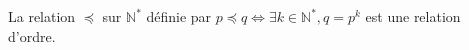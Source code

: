 La relation $\preccurlyeq$ sur $\mathbb N^*$ définie par $p\preccurlyeq q \iff \exists k\in\mathbb N^*,q=p^k$ est une relation d'ordre.

\begin{reponses}
\end{reponses}

